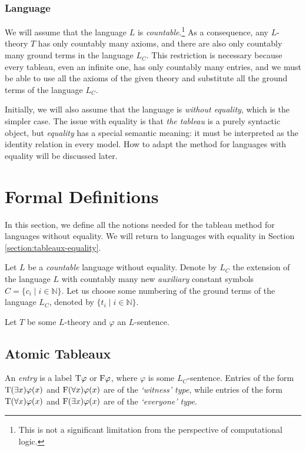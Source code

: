 \subsubsection{Language}

We will assume that the language $L$ is \emph{countable}.\footnote{This is not a significant limitation from the perspective of computational logic.} As a consequence, any $L$-theory $T$ has only countably many axioms, and there are also only countably many ground terms in the language $L_C$. This restriction is necessary because every tableau, even an infinite one, has only countably many entries, and we must be able to use all the axioms of the given theory and substitute all the ground terms of the language $L_C$.

Initially, we will also assume that the language is \emph{without equality}, which is the simpler case. The issue with equality is that \emph{the tableau} is a purely syntactic object, but \emph{equality} has a special semantic meaning: it must be interpreted as the identity relation in every model. How to adapt the method for languages with equality will be discussed later.

\section{Formal Definitions}

In this section, we define all the notions needed for the tableau method for languages without equality. We will return to languages with equality in Section \ref{section:tableaux-equality}.

Let $L$ be a \emph{countable} language without equality. Denote by $L_C$ the extension of the language $L$ with countably many new \emph{auxiliary} constant symbols $C=\{c_i\mid i\in \mathbb N\}$. Let us choose some numbering of the ground terms of the language $L_C$, denoted by $\{t_i\mid i\in\mathbb N\}$.

Let $T$ be some $L$-theory and $\varphi$ an $L$-sentence.

\subsection{Atomic Tableaux}

An \emph{entry} is a label $\mathrm{T}\varphi$ or $\mathrm{F}\varphi$, where $\varphi$ is some $L_C$-sentence. Entries of the form $\mathrm{T}(\exists x)\varphi(x)$ and $\mathrm{F}(\forall x)\varphi(x)$ are of the \emph{`witness' type}, while entries of the form $\mathrm{T}(\forall x)\varphi(x)$ and $\mathrm{F}(\exists x)\varphi(x)$ are of the \emph{`everyone' type}.

